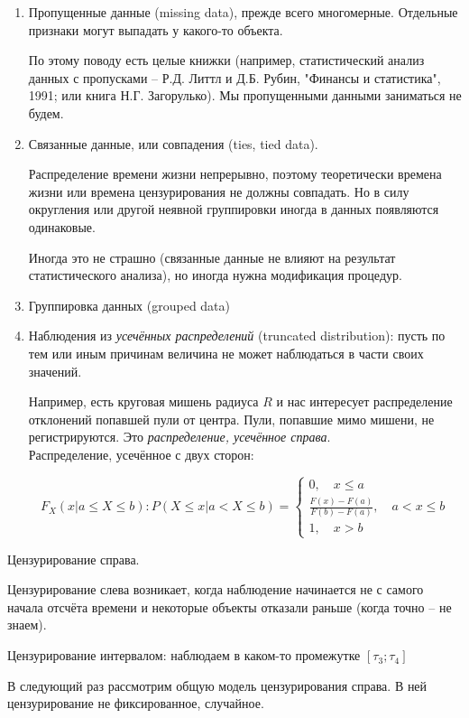 \documentclass[main.tex]{subfiles}
\begin{document}
\begin{enumerate}[noitemsep]
	\item Пропущенные данные (missing data), прежде всего многомерные.
	Отдельные признаки могут выпадать у какого-то объекта.
	
	По этому поводу есть целые книжки (например, статистический анализ данных с пропусками -- Р.Д. Литтл и Д.Б. Рубин, "Финансы и статистика", 1991; или книга Н.Г. Загорулько).
	Мы пропущенными данными заниматься не будем.
	
	\item Связанные данные, или совпадения (ties, tied data).
	
	Распределение времени жизни непрерывно, поэтому теоретически времена жизни или времена цензурирования не должны совпадать.
	Но в силу округления или другой неявной группировки иногда в данных появляются одинаковые.
	
	Иногда это не страшно (связанные данные не влияют на результат статистического анализа), но иногда нужна модификация процедур.
	
	\item Группировка данных (grouped data)
	
	\item Наблюдения из \emph{ усечённых распределений } (truncated distribution): пусть по тем или иным причинам величина не может наблюдаться в части своих значений.
	
	Например, есть круговая мишень радиуса $ R $ и нас интересует распределение отклонений попавшей пули от центра.
	Пули, попавшие мимо мишени, не регистрируются.
	Это \emph{распределение, усечённое справа}. \\
	
	Распределение, усечённое с двух сторон:
	
	\[ F_X(x | a \le X \le b) : P(X \le x | a < X \le b) = \begin{cases}
		0, \quad x \le a \\
		\frac{F(x) - F(a)}{ F(b) - F(a) }, \quad a < x \le b \\
		1, \quad x > b
	\end{cases} \]
\end{enumerate}


Цензурирование справа.

Цензурирование слева возникает, когда наблюдение начинается не с самого начала отсчёта времени и некоторые объекты отказали раньше (когда точно -- не знаем).

Цензурирование интервалом: наблюдаем в каком-то промежутке $ [\tau_3; \tau_4] $

В следующий раз рассмотрим общую модель цензурирования справа.
В ней цензурирование не фиксированное, случайное.
\end{document}
